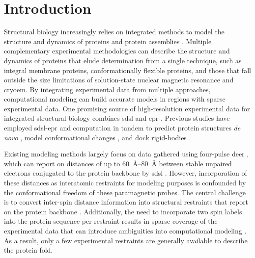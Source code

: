 \section{Introduction}

Structural biology increasingly relies on integrated methods to model the structure and dynamics of proteins and protein assemblies \citep*{Steven2008, Xia2017}. Multiple complementary experimental methodologies can describe the structure and dynamics of proteins that elude determination from a single technique, such as integral membrane proteins, conformationally flexible proteins, and those that fall outside the size limitations of solution-state nuclear magnetic resonance and \gls{cryoem}. By integrating experimental data from multiple approaches, computational modeling can build accurate models in regions with sparse experimental data. One promising source of high-resolution experimental data for integrated structural biology combines \gls{sdsl} and \gls{epr} \citep*{Jeschke2018a, Sahu2018}. Previous studies have employed \gls{sdsl}-\gls{epr} and computation in tandem to predict protein structures \emph{de novo} \citep*{Alexander2008, Fischer2015, Fischer2017, Fischer2016, Hirst2011, Kazmier2011, Ling2016, Yang2010}, model conformational changes \citep*{Kazmier2014, Kazmier2014a, Marinelli2019, Raghuraman2014}, and dock rigid-bodies \citep*{ Bhatnagar2007, Edwards2014, Hilger2007}.

Existing modeling methods largely focus on data gathered using four-pulse \gls{deer} \citep*{Pannier2000}, which can report on distances of up to \SIrange{60}{80}{\angstrom} between stable unpaired electrons conjugated to the protein backbone by \gls{sdsl} \citep*{Jeschke2012, Mchaourab2011}. However, incorporation of these distances as interatomic restraints for modeling purposes is confounded by the conformational freedom of these paramagnetic probes. The central challenge is to convert inter-spin distance information into structural restraints that report on the protein backbone \citep*{Abdullin2016, Alexander2014, Iwahara2004}. Additionally, the need to incorporate two spin labels into the protein sequence per restraint results in sparse coverage of the experimental data that can introduce ambiguities into computational modeling \citep*{Kazmier2011}. As a result, only a few experimental restraints are generally available to describe the protein fold.

